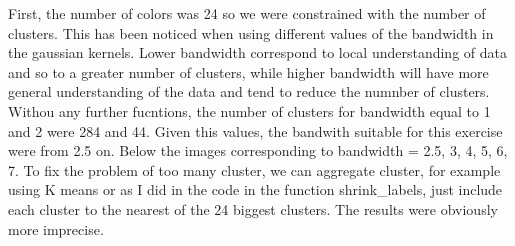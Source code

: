 \documentclass{ETHExercise}
\begin{document}
First, the number of colors was 24 so we were constrained with the number of clusters.
This has been noticed when using different values of the bandwidth in the gaussian kernels.
Lower bandwidth correspond to local understanding of data and so to a greater number of clusters, 
while higher bandwidth will have more general understanding of the data and tend to reduce the numnber of 
clusters. Withou any further fucntions, the number of clusters for bandwidth equal to 1 and 2 were 284 and 44.
Given this values, the bandwith suitable for this exercise were from 2.5 on.
Below the images corresponding to bandwidth = 2.5, 3, 4, 5, 6, 7.
To fix the problem of too many cluster, we can aggregate cluster, for example using K means or as I did in the 
code in the function shrink\_labels, just include each cluster to the nearest of the 24 biggest clusters. The results were 
obviously more imprecise.

\end{document}
